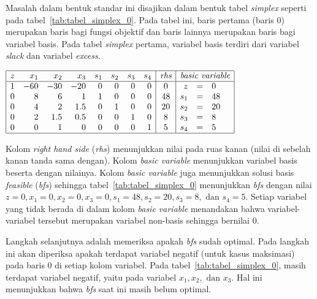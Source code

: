Masalah dalam bentuk standar ini disajikan dalam bentuk tabel \textit{simplex} seperti pada tabel~\ref{tab:tabel_simplex_0}. Pada tabel ini, baris pertama (baris 0) merupakan baris bagi fungsi objektif dan baris lainnya merupakan baris bagi variabel basis. Pada tabel \textit{simplex} pertama, variabel basis terdiri dari variabel \textit{slack} dan variabel \textit{excess}.

\begin{center}
	\label{tab:tabel_simplex_0}
	$
	\begin{array}{|r r r r r r r r|c|r c l|}
		\hline
		z & x_1 & x_2 & x_3 & s_1 & s_2 & s_3 & s_4 & \textit{rhs} & \multicolumn{3}{c|}{\textit{basic variable}}\\
		\hline
		1 & -60 & -30 & -20 & 0 & 0 & 0 & 0 & 0 & z & = & 0\\
		0 & 8 & 6 & 1 & 1 & 0 & 0 & 0 & 48 & s_1 & = & 48\\
		0 & 4 & 2 & 1.5 & 0 & 1 & 0 & 0 & 20 & s_2 & = & 20\\
		0 & 2 & 1.5 & 0.5 & 0 & 0 & 1 & 0 & 8 & s_3 & = & 8\\
		0 & 0 & 1 & 0 & 0 & 0 & 0 & 1 & 5 & s_4 & = & 5\\
		\hline
	\end{array}
	$
\end{center}

Kolom \textit{right hand side} (\textit{rhs}) menunjukkan nilai pada ruas kanan (nilai di sebelah kanan tanda sama dengan). Kolom \textit{basic variable} menunjukkan variabel basis beserta dengan nilainya. Kolom \textit{basic variable} juga menunjukkan solusi basis \textit{feasible} (\textit{bfs}) sehingga tabel~\ref{tab:tabel_simplex_0} menunjukkan \textit{bfs} dengan nilai \(z=0, x_1=0, x_2=0, x_3=0, s_1=48, s_2=20, s_3=8, \text{ dan } s_4=5\). Setiap variabel yang tidak berada di dalam kolom \textit{basic variable} menandakan bahwa variabel-variabel tersebut merupakan variabel non-basis sehingga bernilai 0.

Langkah selanjutnya adalah memeriksa apakah \textit{bfs} sudah optimal. Pada langkah ini akan diperiksa apakah terdapat variabel negatif (untuk kasus maksimasi) pada baris 0 di setiap kolom variabel. Pada tabel~\ref{tab:tabel_simplex_0}, masih terdapat variabel negatif, yaitu pada variabel \(x_1, x_2, \text{ dan } x_3\).
Hal ini menunjukkan bahwa \textit{bfs} saat ini masih belum optimal.

